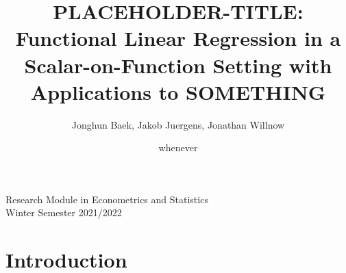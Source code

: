 \documentclass[11pt,twoside,a4paper]{article}
\begin{document}
	\title{{\LARGE {\color{red}PLACEHOLDER-TITLE:} Functional Linear Regression in a Scalar-on-Function Setting with Applications to SOMETHING}}
	\author{Jonghun Baek, Jakob Juergens, Jonathan Willnow}
	\date{{\color{red}whenever}}
	\maketitle
	\vspace{1.5 cm}
	\begin{center}
		Research Module in Econometrics and Statistics \\
		Winter Semester 2021/2022
	\end{center}
	
	\newpage
	
	\tableofcontents
	
	\newpage
	
	\section{Introduction}
	
\end{document}
